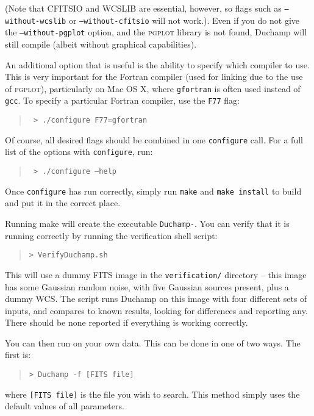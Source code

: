 (Note that CFITSIO and WCSLIB are essential, however, so flags such as
\texttt{--without-wcslib} or \texttt{--without-cfitsio} will not
work.).  Even if you do not give the \texttt{--without-pgplot} option,
and the \textsc{pgplot} library is not found, Duchamp will still
compile (albeit without graphical capabilities).

An additional option that is useful is the ability to specify which
compiler to use. This is very important for the Fortran compiler (used
for linking due to the use of \textsc{pgplot}), particularly on Mac OS
X, where \texttt{gfortran} is often used instead of \texttt{gcc}. To
specify a particular Fortran compiler, use the \texttt{F77} flag:
\begin{quote}
{\footnotesize
\texttt{%
> ./configure F77=gfortran}
}
\end{quote}

Of course, all desired flags should be combined in one
\texttt{configure} call. For a full list of the options with
\texttt{configure}, run:
\begin{quote}
{\footnotesize
\texttt{%
> ./configure --help}
}
\end{quote}
Once \texttt{configure} has run correctly, simply run \texttt{make}
and \texttt{make install} to build \duchamp and put it in the correct
place. 


Running make will create the executable \texttt{Duchamp-{\version}}. You can
verify that it is running correctly by running the verification shell
script:
\begin{quote}
{\footnotesize
\texttt{> VerifyDuchamp.sh}
}
\end{quote}
This will use a dummy FITS image in the \texttt{verification/}
directory -- this image has some Gaussian random noise, with five
Gaussian sources present, plus a dummy WCS. The script runs
Duchamp on this image with four different sets of inputs, and
compares to known results, looking for differences and reporting
any. There should be none reported if everything is working correctly.

You can then run \duchamp on your own data. This can be done in one
of two ways. The first is:
\begin{quote}
{\footnotesize
\texttt{> Duchamp -f [FITS file]}
}
\end{quote}
where \texttt{[FITS file]} is the file you wish to search. This method
simply uses the default values of all parameters.

